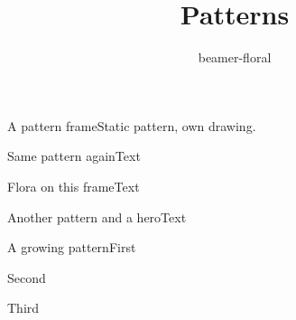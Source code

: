 \documentclass[aspectratio=169]{beamer}
\title{Patterns}\author{beamer-floral}\date{}
\begin{document}
\begin{frame}{A pattern frame}Static pattern, own drawing.\end{frame}
\begin{frame}{Same pattern again}Text\end{frame}
\begin{frame}{Flora on this frame}Text\end{frame}
\begin{frame}{Another pattern and a hero}Text\end{frame}
\begin{frame}{A growing pattern}First\pause\par Second\pause\par Third\end{frame}
\end{document}

